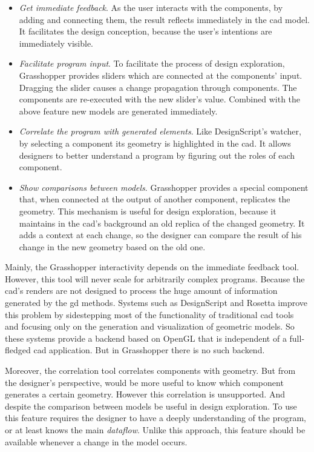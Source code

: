 \begin{itemize}
 \item \textit{Get immediate feedback}. As the user interacts with the components, by adding and connecting them, the result reflects immediately in the \ac{cad} model. It facilitates the design conception, because the user's intentions are immediately visible. 
 \item \textit{Facilitate program input}. To facilitate the process of design exploration, Grasshopper provides sliders which are connected at the components' input. Dragging the slider causes a change propagation through components. The components are re-executed with the new slider's value. Combined with the above feature new models are generated immediately.
 \item \textit{Correlate the program with generated elements}. Like DesignScript's watcher, by selecting a component its geometry is highlighted in the \ac{cad}. It allows designers to better understand a program by figuring out the roles of each component.
 \item \textit{Show comparisons between models}. Grasshopper provides a special component that, when connected at the output of another component, replicates the geometry. This mechanism is useful for design exploration, because it maintains in the \ac{cad}'s background an old replica of the changed geometry. It adds a context at each change, so the designer can compare the result of his change in the new geometry based on the old one.
\end{itemize}

Mainly, the Grasshopper interactivity depends on the immediate feedback tool. However, this tool will never scale for arbitrarily complex programs. Because the \ac{cad}'s renders are not designed to process the huge amount of information generated by the \ac{gd} methods. Systems such as DesignScript and Rosetta improve this problem by sidestepping most of the functionality of traditional \ac{cad} tools and focusing only on the generation and visualization of geometric models. So these systems provide a backend based on OpenGL that is independent of a full-fledged \ac{cad} application. But in Grasshopper there is no such backend.

Moreover, the correlation tool correlates components with geometry. But from the designer's perspective, would be more useful to know which component generates a certain geometry. However this correlation is unsupported. And despite the comparison between models be useful in design exploration. To use this feature requires the designer to have a deeply understanding of the program, or at least knows the main \textit{dataflow}. Unlike this approach, this feature should be available whenever a change in the model occurs.
